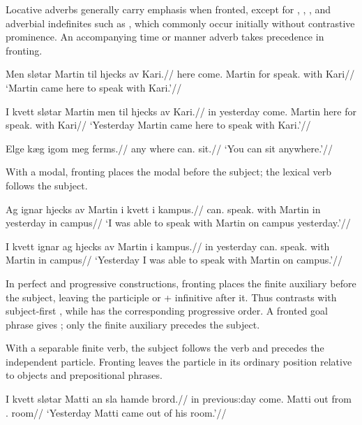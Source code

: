 Locative adverbs generally carry emphasis when fronted, except for , , , and adverbial indefinites such as , which commonly occur initially without contrastive prominence. An accompanying time or manner adverb takes precedence in fronting.

\pex
\begingl
\gla Men sløtar Martin til hjecks av Kari.//
\glb here come.\Pst{} Martin for speak.\Inf{} with Kari//
\glft `Martin came here to speak with Kari.'//
\endgl
\xe

\pex
\begingl
\gla I kvett sløtar Martin men til hjecks av Kari.//
\glb in yesterday come.\Pst{} Martin here for speak.\Inf{} with Kari//
\glft `Yesterday Martin came here to speak with Kari.'//
\endgl
\xe

\pex
\begingl
\gla Elge kæg igom meg ferms.//
\glb any where can.\Pres{} \Second{}\Sg{} sit.\Inf{}//
\glft `You can sit anywhere.'//
\endgl
\xe

With a modal, fronting places the modal before the subject; the lexical verb follows the subject.

\pex
\begingl
\gla Ag ignar hjecks av Martin i kvett i kampus.//
\glb \First{}\Sg{} can.\Pst{} speak.\Inf{} with Martin in yesterday in campus//
\glft `I was able to speak with Martin on campus yesterday.'//
\endgl
\xe

\pex
\begingl
\gla I kvett ignar ag hjecks av Martin i kampus.//
\glb in yesterday can.\Pst{} \First{}\Sg{} speak.\Inf{} with Martin in campus//
\glft `Yesterday I was able to speak with Martin on campus.'//
\endgl
\xe

In perfect and progressive constructions, fronting places the finite auxiliary before the subject, leaving the participle or  + infinitive after it. Thus  contrasts with subject-first , while  has the corresponding progressive order. A fronted goal phrase gives ; only the finite auxiliary precedes the subject.

With a separable finite verb, the subject follows the verb and precedes the independent particle. Fronting leaves the particle in its ordinary position relative to objects and prepositional phrases.

\pex
\begingl
\gla I kvett sløtar Matti an sla hamde brord.//
\glb in previous:day come.\Pst{} Matti out from \Refl{}.\Nt{} room//
\glft `Yesterday Matti came out of his room.'//
\endgl
\xe

